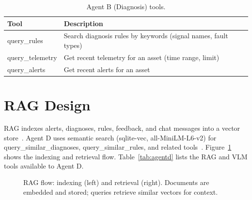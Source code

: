 \documentclass[12pt,letterpaper]{report}
\begin{document}
\begin{table}[htbp]
\centering
\caption{Agent B (Diagnosis) tools.}
\label{tab:agentb}
\begin{tabular}{ll}
\toprule
\textbf{Tool} & \textbf{Description} \\
\midrule
query\_rules & Search diagnosis rules by keywords (signal names, fault types) \\
query\_telemetry & Get recent telemetry for an asset (time range, limit) \\
query\_alerts & Get recent alerts for an asset \\
\bottomrule
\end{tabular}
\end{table}

\section{RAG Design}

RAG indexes alerts, diagnoses, rules, feedback, and chat messages into a vector store~\cite{lewis2020rag}. Agent D uses semantic search (sqlite-vec, all-MiniLM-L6-v2) for query\_similar\_diagnoses, query\_similar\_rules, and related tools~\cite{reimers2019sentence,sqlitevec2024}. Figure~\ref{fig:rag} shows the indexing and retrieval flow. Table~\ref{tab:agentd} lists the RAG and VLM tools available to Agent D.

\begin{figure}[htbp]
\centering
{}
\caption{RAG flow: indexing (left) and retrieval (right). Documents are embedded and stored; queries retrieve similar vectors for context.}
\label{fig:rag}
\end{figure}
\end{document}
